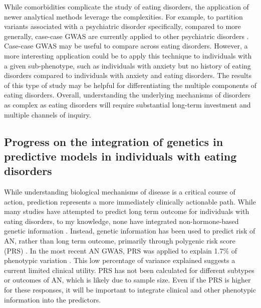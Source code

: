 While comorbidities complicate the study of eating disorders, the application of newer analytical methods leverage the complexities. For example, to partition variants associated with a psychiatric disorder specifically, compared to more generally, case-case GWAS are currently applied to other psychiatric disorders \cite{RN4574}. Case-case GWAS may be useful to compare across eating disorders. However, a more interesting application could be to apply this technique to individuals with a given sub-phenotype, such as individuals with anxiety but no history of eating disorders compared to individuals with anxiety and eating disorders. The results of this type of study may be helpful for differentiating the multiple components of eating disorders. Overall, understanding the underlying mechanisms of disorders as complex as eating disorders will require substantial long-term investment and multiple channels of inquiry. 

\subsection{Progress on the integration of genetics in predictive models in individuals with eating disorders}
	While understanding biological mechanisms of disease is a critical course of action, prediction represents a more immediately clinically actionable path. While many studies have attempted to predict long term outcome for individuals with eating disorders, to my knowledge, none have integrated non-hormone-based genetic information \cite{RN1168, RN1167, RN4514, RN4543, RN4539}. Instead, genetic information has been used to predict risk of AN, rather than long term outcome, primarily through polygenic risk score (PRS) \cite{RN40}. In the most recent AN GWAS, PRS was applied to explain 1.7\% of phenotypic variation \cite{RN4568}. This low percentage of variance explained suggests a current limited clinical utility. PRS has not been calculated for different subtypes or outcomes of AN, which is likely due to sample size. Even if the PRS is higher for these responses, it will be important to integrate clinical and other phenotypic information into the predictors. 

